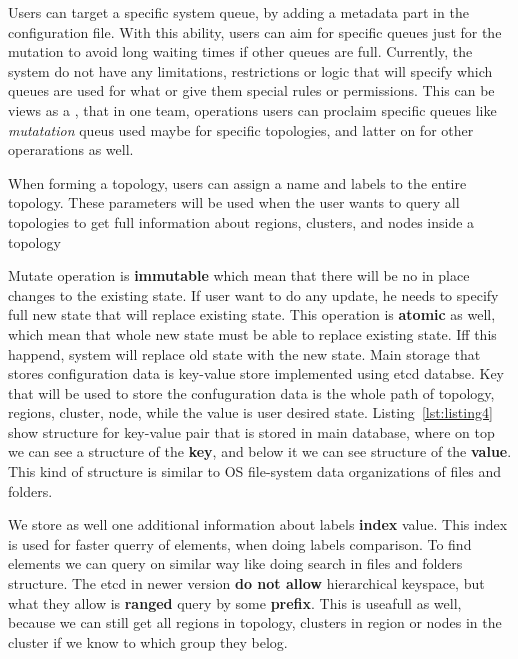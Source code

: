 Users can target a specific system queue, by adding a metadata part in the configuration file. With this ability, users can aim for specific queues just for the mutation to avoid long waiting times if other queues are full. Currently, the system do not have any limitations, restrictions or logic that will specify which queues are used for what or give them special rules or permissions. This can be views as a , that in one team, operations users can proclaim specific queues like \textit{mutatation} queus used maybe for specific topologies, and latter on for other operarations as well.

When forming a topology, users can assign a name and labels to the entire topology. These parameters will be used when the user wants to query all topologies to get full information about regions, clusters, and nodes inside a topology

Mutate operation is \textbf{immutable} which mean that there will be no in place changes to the existing state. If user want to do any update, he needs to specify full new state that will replace existing state. This operation is \textbf{atomic} as well, which mean that whole new state must be able to replace existing state. Iff this happend, system will replace old state with the new state. Main storage that stores configuration data is key-value store implemented using etcd databse. Key that will be used to store the confuguration data is the whole path of topology, regions, cluster, node, while the value is user desired state. Listing~\ref{lst:listing4} show structure for key-value pair that is stored in main database, where on top we can see a structure of the \textbf{key}, and below it we can see structure of the \textbf{value}. This kind of structure is similar to OS file-system data organizations of files and folders.



We store as well one additional information about labels \textbf{index} value. This index is used for faster querry of elements, when doing labels comparison. To find elements we can query on similar way like doing search in files and folders structure. The etcd in newer version \textbf{do not allow} hierarchical keyspace, but what they allow is \textbf{ranged} query by some \textbf{prefix}. This is useafull as well, because we can still get all regions in topology, clusters in region or nodes in the cluster if we know to which group they belog.


